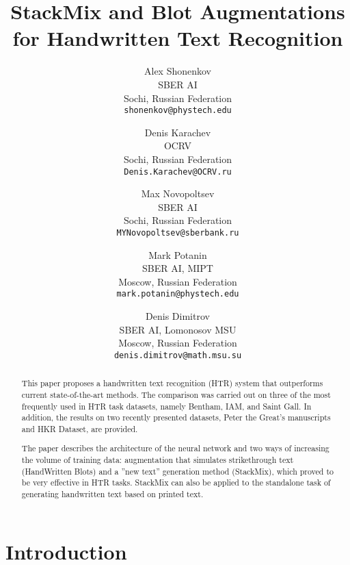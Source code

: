 \documentclass[10pt,twocolumn,letterpaper]{article}
\begin{document}
\title{StackMix and Blot Augmentations for Handwritten Text Recognition}

\author{
Alex Shonenkov\\
SBER AI \\
Sochi, Russian Federation \\
{\tt\small shonenkov@phystech.edu}
\and
Denis Karachev\\
OCRV\\
Sochi, Russian Federation \\
{\tt\small Denis.Karachev@OCRV.ru}
\and
Max Novopoltsev\\
SBER AI \\
Sochi, Russian Federation \\
{\tt\small MYNovopoltsev@sberbank.ru}
\and
Mark Potanin\\
SBER AI, MIPT \\
Moscow, Russian Federation \\
{\tt\small mark.potanin@phystech.edu}
\and
Denis Dimitrov\\
SBER AI, Lomonosov MSU \\
Moscow, Russian Federation \\
{\tt\small denis.dimitrov@math.msu.su}
}

\maketitle


\begin{abstract}





This paper proposes a handwritten text recognition (HTR) system that outperforms current state-of-the-art methods. 
The comparison was carried out on three of the most frequently used in HTR task datasets, namely Bentham, IAM, and Saint Gall. In addition, the results on two recently presented datasets, Peter the Great’s manuscripts and HKR Dataset, are provided.

The paper describes the architecture of the neural network and two ways of increasing the volume of training data: augmentation that simulates strikethrough text (HandWritten Blots) and a ”new text” generation method (StackMix), which proved to be very effective in HTR tasks. StackMix can also be applied to the standalone task of generating handwritten text based on printed text. 

\end{abstract}

\section{Introduction}
\end{document}

